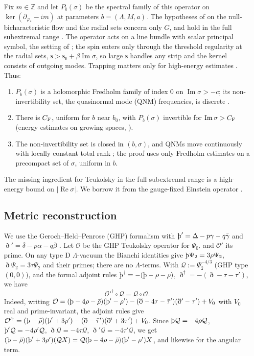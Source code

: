 \documentclass[11pt]{amsart}
\theoremstyle{definition}
\theoremstyle{remark}
\numberwithin{equation}{section}
\newcommand{\Th}{\text{\th}}
\newcommand{\Z}{\mathbb{Z}}
\renewcommand{\Im}{\operatorname{Im}}
\renewcommand{\Re}{\operatorname{Re}}
\begin{document}
Fix $m\in\Z$ and let $P_b(\sigma)$ be the spectral family of this operator on $\ker(\partial_{\varphi_*}-im)$ at
parameters $b=(\Lambda,M,a)$. The hypotheses of \cite[\S5.1]{HV18} on the null-bicharacteristic flow and the radial
sets concern only $G$, and hold in the full subextremal range \cite{PV25,PV24}. The operator acts on a line bundle with
scalar principal symbol, the setting of \cite{Vas13,HV18}; the spin enters only through the threshold regularity at
the radial sets, $\mathsf s>\mathsf s_0+\beta\Im\sigma$, so large $\mathsf s$ handles any strip and the kernel consists of
outgoing modes. Trapping matters only for high-energy estimates \cite[Theorem~5.4]{HV18}. Thus:
\begin{enumerate}[label=(F\arabic*)]
\item $P_b(\sigma)$ is a holomorphic Fredholm family of index $0$ on $\Im\sigma>-c$; its non-invertibility set, the
quasinormal mode (QNM) frequencies, is discrete \cite[Theorem~5.4]{HV18}.
\item There is $C_{\rm F}$, uniform for $b$ near $b_0$, with $P_b(\sigma)$ invertible for $\Im\sigma>C_{\rm F}$ (energy estimates
on growing spaces, \cite[\S5.1.2]{HV18}).
\item The non-invertibility set is closed in $(b,\sigma)$, and QNMs move continuously with locally constant total rank
\cite[Proposition~5.11]{HV18}; the proof uses only Fredholm estimates on a precompact set of $\sigma$, uniform in $b$.
\end{enumerate}
The missing ingredient for Teukolsky in the full subextremal range is a high-energy bound on $|\Re\sigma|$. We borrow
it from the gauge-fixed Einstein operator \cite{HPV25}.

\subsection{Metric reconstruction}
We use the Geroch--Held--Penrose (GHP) formalism with $\Th'=\Delta-p\gamma-q\bar\gamma$ and
$\eth'=\bar\delta-p\alpha-q\bar\beta$ \cite{GHP73}. Let $\mathcal O$ be the GHP Teukolsky operator for $\Psi_0$, and
$\mathcal O'$ its prime. On any type D $\Lambda$-vacuum the Bianchi identities give $\Th\Psi_2=3\rho\Psi_2$,
$\eth\Psi_2=3\tau\Psi_2$ and their primes; there are no $\Lambda$-terms. With $\mathcal Q:=\Psi_2^{-4/3}$ (GHP type $(0,0)$),
and the formal adjoint rules $\Th^\dagger=-(\Th-\rho-\bar\rho)$, $\eth^\dagger=-(\eth-\tau-\bar\tau')$, we have
\begin{equation}\label{eq:adjoint}
\mathcal O'^\dagger\circ\mathcal Q=\mathcal Q\circ\mathcal O.
\end{equation}
Indeed, writing $\mathcal O=(\Th-4\rho-\bar\rho)(\Th'-\rho')-(\eth-4\tau-\bar\tau')(\eth'-\tau')+V_0$ with $V_0$ real and
prime-invariant, the adjoint rules give
$\mathcal O'^\dagger=(\Th-\bar\rho)(\Th'+3\rho')-(\eth-\bar\tau')(\eth'+3\tau')+V_0$. Since $\Th\mathcal Q=-4\rho\mathcal Q$,
$\Th'\mathcal Q=-4\rho'\mathcal Q$, $\eth\mathcal Q=-4\tau\mathcal Q$, $\eth'\mathcal Q=-4\tau'\mathcal Q$, we get $(\Th-\bar\rho)(\Th'+3\rho')(\mathcal QX)=\mathcal Q(\Th-4\rho-\bar\rho)(\Th'-\rho')X$,
and likewise for the angular term.
\end{document}
